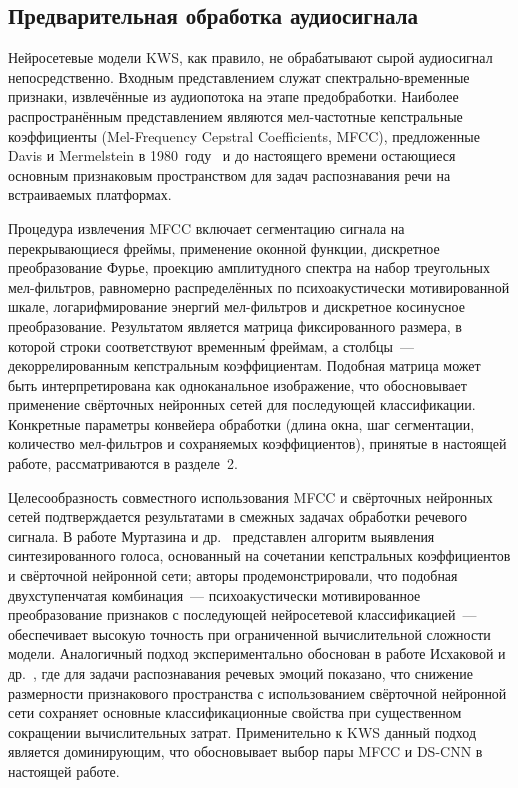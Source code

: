 \subsection{Предварительная обработка аудиосигнала}

Нейросетевые модели KWS, как правило, не обрабатывают сырой аудиосигнал
непосредственно. Входным представлением служат спектрально-временные
признаки, извлечённые из аудиопотока на этапе предобработки. Наиболее
распространённым представлением являются мел-частотные кепстральные
коэффициенты (Mel-Frequency Cepstral Coefficients, MFCC), предложенные
Davis и Mermelstein в 1980~году~\cite{src:10} и до настоящего времени
остающиеся основным признаковым пространством для задач распознавания
речи на встраиваемых платформах.

Процедура извлечения MFCC включает сегментацию сигнала на перекрывающиеся
фреймы, применение оконной функции, дискретное преобразование Фурье,
проекцию амплитудного спектра на набор треугольных мел-фильтров,
равномерно распределённых по психоакустически мотивированной шкале,
логарифмирование энергий мел-фильтров и дискретное косинусное
преобразование. Результатом является матрица фиксированного размера, в
которой строки соответствуют временны\'{м} фреймам, а столбцы~---
декоррелированным кепстральным коэффициентам. Подобная матрица может
быть интерпретирована как одноканальное изображение, что обосновывает
применение свёрточных нейронных сетей для последующей классификации.
Конкретные параметры конвейера обработки (длина окна, шаг сегментации,
количество мел-фильтров и сохраняемых коэффициентов), принятые в
настоящей работе, рассматриваются в разделе~2.

Целесообразность совместного использования MFCC и свёрточных нейронных
сетей подтверждается результатами в смежных задачах обработки речевого
сигнала. В работе Муртазина и др.~\cite{src:24} представлен алгоритм
выявления синтезированного голоса, основанный на сочетании кепстральных
коэффициентов и свёрточной нейронной сети; авторы продемонстрировали,
что подобная двухступенчатая комбинация~--- психоакустически
мотивированное преобразование признаков с последующей нейросетевой
классификацией~--- обеспечивает высокую точность при ограниченной
вычислительной сложности модели. Аналогичный подход экспериментально
обоснован в работе Исхаковой и др.~\cite{src:26}, где для задачи
распознавания речевых эмоций показано, что снижение размерности
признакового пространства с использованием свёрточной нейронной сети
сохраняет основные классификационные свойства при существенном
сокращении вычислительных затрат. Применительно к KWS данный подход
является доминирующим, что обосновывает выбор пары MFCC и DS-CNN в
настоящей работе.


